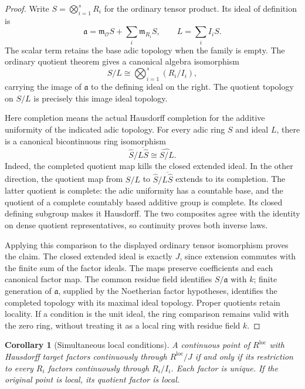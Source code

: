 \documentclass[11pt]{amsart}
\newtheorem{corollary}[corollary]{Corollary}
\theoremstyle{definition}
\theoremstyle{remark}
\newcommand{\OO}{\mathcal O}
\newcommand{\frakm}{\mathfrak m}
\newcommand{\fraka}{\mathfrak a}
\begin{document}
\begin{proof}
Write \(S=\bigotimes_{i=1}^{s}R_i\) for the ordinary tensor product. Its ideal of definition is
\[
\fraka=\frakm_{\OO}S+\sum_i\frakm_{R_i}S,
\qquad L=\sum_i I_iS.
\]
The scalar term retains the base adic topology when the family is empty. The ordinary quotient theorem gives a canonical algebra isomorphism
\[
S/L\cong\bigotimes_{i=1}^{s}(R_i/I_i),
\]
carrying the image of \(\fraka\) to the defining ideal on the right. The quotient topology on \(S/L\) is precisely this image ideal topology.

Here completion means the actual Hausdorff completion for the additive uniformity of the indicated adic topology. For every adic ring \(S\) and ideal \(L\), there is a canonical bicontinuous ring isomorphism
\[
\widehat S\big/\overline{L\widehat S}\cong\widehat{S/L}.
\]
Indeed, the completed quotient map kills the closed extended ideal. In the other direction, the quotient map from \(S/L\) to \(\widehat S/\overline{L\widehat S}\) extends to its completion. The latter quotient is complete: the adic uniformity has a countable base, and the quotient of a complete countably based additive group is complete. Its closed defining subgroup makes it Hausdorff. The two composites agree with the identity on dense quotient representatives, so continuity proves both inverse laws.

Applying this comparison to the displayed ordinary tensor isomorphism proves the claim. The closed extended ideal is exactly \(J\), since extension commutes with the finite sum of the factor ideals. The maps preserve coefficients and each canonical factor map. The common residue field identifies \(S/\fraka\) with \(k\); finite generation of \(\fraka\), supplied by the Noetherian factor hypotheses, identifies the completed topology with its maximal ideal topology. Proper quotients retain locality. If a condition is the unit ideal, the ring comparison remains valid with the zero ring, without treating it as a local ring with residue field \(k\).
\end{proof}

\begin{corollary}[Simultaneous local conditions]\label{cor:simultaneous_local}
A continuous point of \(R^{\mathrm{loc}}\) with Hausdorff target factors continuously through \(R^{\mathrm{loc}}/J\) if and only if its restriction to every \(R_i\) factors continuously through \(R_i/I_i\). Each factor is unique. If the original point is local, its quotient factor is local.
\end{corollary}
\end{document}
